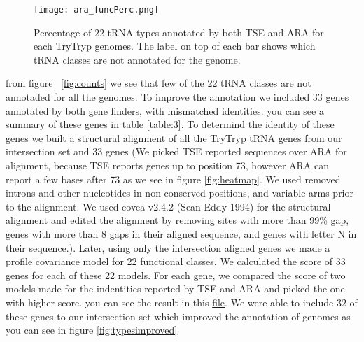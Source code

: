 \documentclass[
10pt, %
a4paper, %
oneside, %
headinclude,footinclude, %
BCOR5mm, %
]{scrartcl}
\begin{document}
\begin{figure}[tb]
\centering 
\texttt{[image: ara\_funcPerc.png]} 
\caption[Genome Comparison]{Percentage of 22 tRNA types annotated by both TSE and ARA for each TryTryp genomes. The label on top of each bar shows which tRNA classes are not annotated for the genome.} %
\label{fig:types} 
\end{figure}

from figure ~\ref{fig:counts} we see that few of the 22 tRNA classes are not annotaded for all the genomes. To improve the annotation we included 33 genes annotated by both gene finders, with mismatched identities. you can see a summary of these genes in table \ref{table:3}. 
To determind the identity of these genes we built a structural alignment of all the TryTryp tRNA genes from our intersection set and 33 genes (We picked TSE reported sequences over ARA for alignment, because TSE reports genes up to position 73, however ARA can report a few bases after 73 as we see in figure \ref{fig:heatmap}. We used removed introns and other nucleotides in non-conserved positions, and variable arms prior to the alignment. We used covea v2.4.2 (Sean Eddy 1994) for the structural alignment and edited the alignment by removing sites with more than 99\% gap, genes with more than 8 gaps in their aligned sequence, and genes with letter N in their sequence.). Later, using only the intersection aligned genes we made a profile covariance model for 22 functional classes. We calculated the score of 33 genes for each of these 22 models. For each gene, we compared the score of two models made for the indentities reported by TSE and ARA and picked the one with higher score. you can see the result in this \href{https://github.com/fhadinezhadUC/Leishmania_2019/blob/master/Results/Integrated_Genes/UndetClassScore.txt} {file}. We were able to include 32 of these genes to our intersection set which improved the annotation of genomes as you can see in figure \ref{fig:typesimproved}


\begin{table}[hbt]
\caption{33 genes annotated by both TSE and ARA with mismatched identity}
\begin{adjustbox}{center}
{}
\label{table:3}
\end{adjustbox}
\end{table}
\end{document}
